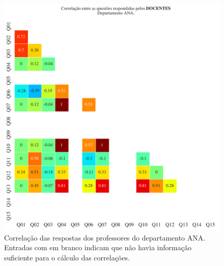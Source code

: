\documentclass[a4paper,10pt]{article}
\begin{document}
\begin{figure}[h]
\centering
\includegraphics[width=0.999\linewidth]{matriz_corr__ANA_docentes.png}
\caption{\label{fig:corr_docentes}Correlação das respostas dos professores do departamento ANA. Entradas com em branco indicam que não havia informação suficiente para o cálculo das correlações.}
\end{figure}
\end{document}

